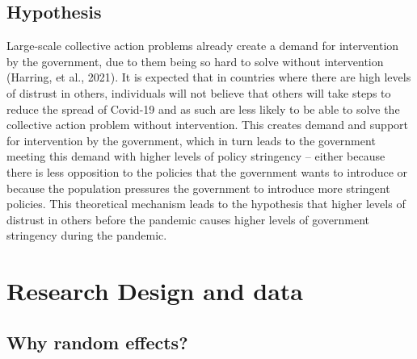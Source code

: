 \documentclass[
  12pt,
]{article}
\begin{document}
\hypertarget{hypothesis}{%
\subsection{Hypothesis}\label{hypothesis}}

Large-scale collective action problems already create a demand for intervention by the government, due to them being so hard to solve without intervention (Harring, et al., 2021). It is expected that in countries where there are high levels of distrust in others, individuals will not believe that others will take steps to reduce the spread of Covid-19 and as such are less likely to be able to solve the collective action problem without intervention. This creates demand and support for intervention by the government, which in turn leads to the government meeting this demand with higher levels of policy stringency -- either because there is less opposition to the policies that the government wants to introduce or because the population pressures the government to introduce more stringent policies. This theoretical mechanism leads to the hypothesis that higher levels of distrust in others before the pandemic causes higher levels of government stringency during the pandemic.\\

\hypertarget{research-design-and-data}{%
\section{Research Design and data}\label{research-design-and-data}}

\hypertarget{why-random-effects}{%
\subsection{Why random effects?}\label{why-random-effects}}
\end{document}
